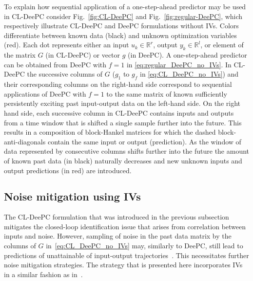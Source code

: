 To explain how sequential application of a one-step-ahead predictor may be used in \ac{CL-DeePC} consider Fig.~\ref{fig:CL-DeePC} and Fig.~\ref{fig:regular-DeePC}, which respectively illustrate \ac{CL-DeePC} and \ac{DeePC} formulations without \ac{IVs}. Colors differentiate between known data (black) and unknown optimization variables (red). Each dot represents either an input ${u_k\in\mathbb{R}^r}$, output ${y_k\in\mathbb{R}^l}$, or element of the matrix $G$ (in \ac{CL-DeePC}) or vector $g$ (in \ac{DeePC}). A one-step-ahead predictor can be obtained from \ac{DeePC} with $f=1$ in \eqref{eq:regular_DeePC_no_IVs}. In \ac{CL-DeePC} the successive columns of $G$ ($g_1$ to $g_f$ in \eqref{eq:CL_DeePC_no_IVs}) and their corresponding columns on the right-hand side correspond to sequential applications of \ac{DeePC} with $f=1$ to the same matrix of known sufficiently persistently exciting past input-output data on the left-hand side. On the right hand side, each successive column in \ac{CL-DeePC} contains inputs and outputs from a time window that is shifted a single sample further into the future. This results in a composition of block-Hankel matrices for which the dashed block-anti-diagonals contain the same input or output (prediction). As the window of data represented by consecutive columns shifts further into the future the amount of known past data (in black) naturally decreases and new unknown inputs and output predictions (in red) are introduced.

%
\subsection{Noise mitigation using \acl{IVs}}
\noindent The \ac{CL-DeePC} formulation that was introduced in the previous subsection mitigates the closed-loop identification issue that arises from correlation between inputs and noise. However, sampling of noise in the past data matrix by the columns of $G$ in~\eqref{eq:CL_DeePC_no_IVs} may, similarly to \ac{DeePC}, still lead to predictions of unattainable of input-output trajectories~\citep{Markovsky2022}. This necessitates further noise mitigation strategies. The strategy that is presented here incorporates \ac{IVs} in a similar fashion as in~\cite{vanWingerden2022}. 

